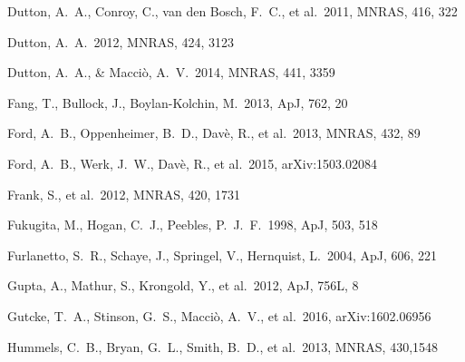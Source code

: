 \documentclass[useAMS,usenatbib]{mn2e}
\def \apj {ApJ}
\def \mnras {MNRAS}
\begin{document}
\begin{thebibliography}{}

 Dutton, A.~A., Conroy, 
  C., van den Bosch, F.~C., et al.\ 2011, \mnras, 416, 322
  
 Dutton, A.~A.\ 2012,
  \mnras, 424, 3123
  
 Dutton,
  A.~A., \& Macci{\`o}, A.~V.\ 2014, \mnras, 441, 3359 



    

 Fang, T., Bullock, J., Boylan-Kolchin, M.\ 2013, \apj, 762, 20

%
 Ford, A.~B., Oppenheimer, B.~D., Dav{\`e}, R., et al.\ 2013, \mnras, 432, 89

%
 Ford, A.~B., Werk, J.~W., Dav{\`e}, R., et al.\ 2015, arXiv:1503.02084

%
 Frank, S., et al.\ 2012, \mnras, 420, 1731

 Fukugita, M., Hogan, C.~J., Peebles, P.~J.~F.\ 1998, \apj, 503, 518

%
 Furlanetto, S.~R., Schaye, J., Springel, V., Hernquist, L.\ 2004, \apj, 606, 221


 Gupta, A., Mathur, S., Krongold, Y., et al.\ 2012, \apj, 756L, 8

 Gutcke, T.~A., Stinson, G.~S., Macci{\`o}, A.~V., et al.\ 2016, arXiv:1602.06956



%
 Hummels, C.~B., Bryan, G.~L., Smith, B.~D., et al.\ 2013, \mnras, 430,1548






\end{thebibliography}
\end{document}
